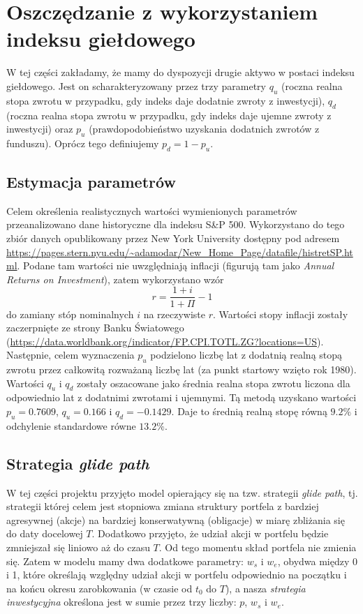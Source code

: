 \documentclass{article}
\begin{document}
\section{Oszczędzanie z wykorzystaniem indeksu giełdowego}
W tej części zakładamy, że mamy do dyspozycji drugie aktywo w postaci indeksu giełdowego.
Jest on scharakteryzowany przez trzy parametry $q_u$ (roczna realna stopa zwrotu w przypadku, gdy indeks daje dodatnie zwroty z inwestycji), $q_d$ (roczna realna stopa zwrotu w przypadku, gdy indeks daje ujemne zwroty z inwestycji) oraz $p_u$ (prawdopodobieństwo uzyskania dodatnich zwrotów z funduszu).
Oprócz tego definiujemy $p_d = 1 - p_u$.

\subsection{Estymacja parametrów}
Celem określenia realistycznych wartości wymienionych parametrów przeanalizowano dane historyczne dla indeksu S\&P 500.
Wykorzystano do tego zbiór danych opublikowany przez New York University dostępny pod adresem \url{https://pages.stern.nyu.edu/~adamodar/New_Home_Page/datafile/histretSP.html}.
Podane tam wartości nie uwzględniają inflacji (figurują tam jako \textit{Annual Returns on Investment}), zatem wykorzystano wzór 
\begin{equation*}
    r = \frac{1 + i}{1 + \Pi} - 1
\end{equation*}
do zamiany stóp nominalnych $i$ na rzeczywiste $r$.
Wartości stopy inflacji zostały zaczerpnięte ze strony Banku Światowego (\url{https://data.worldbank.org/indicator/FP.CPI.TOTL.ZG?locations=US}).
Następnie, celem wyznaczenia $p_u$ podzielono liczbę lat z dodatnią realną stopą zwrotu przez całkowitą rozważaną liczbę lat (za punkt startowy wzięto rok 1980).
Wartości $q_u$ i $q_d$ zostały oszacowane jako średnia realna stopa zwrotu liczona dla odpowiednio lat z dodatnimi zwrotami i ujemnymi.
Tą metodą uzyskano wartości $p_u=0.7609$, $q_u = 0.166$ i $q_d = -0.1429$.
Daje to średnią realną stopę równą $9.2\%$ i odchylenie standardowe równe $13.2\%$.

\subsection{Strategia \textit{glide path}}
W tej części projektu przyjęto model opierający się na tzw. strategii \textit{glide path}, tj. strategii której celem jest stopniowa zmiana struktury portfela z bardziej agresywnej (akcje) na bardziej konserwatywną (obligacje) w miarę zbliżania się do daty docelowej $T$.
Dodatkowo przyjęto, że udział akcji w portfelu będzie zmniejszał się liniowo aż do czasu $T$.
Od tego momentu skład portfela nie zmienia się.
Zatem w modelu mamy dwa dodatkowe parametry: $w_s$ i $w_e$, obydwa między 0 i 1, które określają względny udział akcji w portfelu odpowiednio na początku i na końcu okresu zarobkowania (w czasie od $t_0$ do $T$), a nasza \textit{strategia inwestycyjna} określona jest w sumie przez trzy liczby: $p$, $w_s$ i $w_e$.
\end{document}
